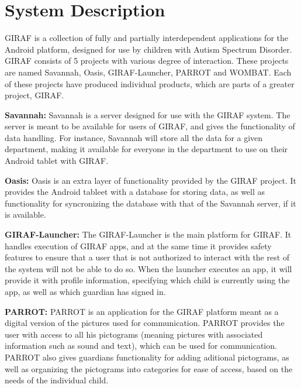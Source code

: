 \section{System Description}
GIRAF is a collection of fully and partially interdependent applications for the Android platform, designed for use by children with Autism Spectrum Disorder.\newline
GIRAF consists of 5 projects with various degree of interaction. These projects are named Savannah, Oasis, GIRAF-Launcher, PARROT and WOMBAT. Each of these projects have produced individual products, which are parts of a greater project, GIRAF.\newline

\textbf{Savannah:} Savannah is a server designed for use with the GIRAF system. The server is meant to be available for users of GIRAF, and gives the functionality of data handling. For instance, Savannah will store all the data for a given department, making it available for everyone in the department to use on their Android tablet with GIRAF.\newline

\textbf{Oasis:} Oasis is an extra layer of functionality provided by the GIRAF project. It provides the Android tableet with a database for storing data, as well as functionality for syncronizing the database with that of the Savannah server, if it is available.\newline

\textbf{GIRAF-Launcher:} The GIRAF-Launcher is the main platform for GIRAF. It handles execution of GIRAF apps, and at the same time it provides safety features to ensure that a user that is not authorized to interact with the rest of the system will not be able to do so. When the launcher executes an app, it will provide it with profile information, specifying which child is currently using the app, as well as which guardian has signed in.\newline

\textbf{PARROT:} PARROT is an application for the GIRAF platform meant as a digital version of the pictures used for communication. PARROT provides the user with access to all his pictograms (meaning pictures with associated information such as sound and text), which can be used for communication. PARROT also gives guardians functionality for adding aditional pictograms, as well as organizing the pictograms into categories for ease of access, based on the needs of the individual child.\newline

